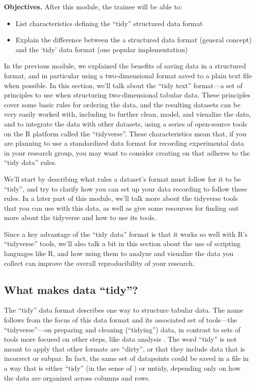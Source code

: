 \documentclass[]{tufte-book}
\providecommand{\tightlist}{%
  \setlength{\itemsep}{0pt}\setlength{\parskip}{0pt}}
\begin{document}
\textbf{Objectives.} After this module, the trainee will be able to:

\begin{itemize}
\tightlist
\item
  List characteristics defining the ``tidy'' structured data format
\item
  Explain the difference between the a structured data format (general concept)
  and the `tidy' data format (one popular implementation)
\end{itemize}

In the previous module, we explained the benefits of saving data in a structured
format, and in particular using a two-dimensional format saved to a plain text
file when possible. In this section, we'll talk about the ``tidy text'' format---a
set of principles to use when structuring two-dimensional tabular data. These
principles cover some basic rules for ordering the data, and the resulting
datasets can be very easily worked with, including to further clean, model, and
visualize the data, and to integrate the data with other datasets, using a
series of open-source tools on the R platform called the ``tidyverse''. These
characteristics mean that, if you are planning to use a standardized data format
for recording experimental data in your research group, you may want to consider
creating on that adheres to the ``tidy data'' rules.

We'll start by describing what rules a dataset's format must follow for it to be
``tidy'', and try to clarify how you can set up your data recording to follow
these rules. In a later part of this module, we'll talk more about the tidyverse
tools that you can use with this data, as well as give some resources for
finding out more about the tidyverse and how to use its tools.

Since a key advantage of the ``tidy data'' format is that it works so well with
R's ``tidyverse'' tools, we'll also talk a bit in this section about the use of
scripting languages like R, and how using them to analyze and visualize the
data you collect can improve the overall reproducibility of your research.

\hypertarget{what-makes-data-tidy}{%
\subsection{What makes data ``tidy''?}\label{what-makes-data-tidy}}

The ``tidy'' data format describes one way to structure tabular data. The name
follows from the focus of this data format and its associated set of tools---the
``tidyverse''---on preparing and cleaning (``tidying'') data, in contrast to sets of
tools more focused on other steps, like data analysis \citep{wickham2014tidy}. The
word ``tidy'' is not meant to apply that other formats are ``dirty'', or that they
include data that is incorrect or subpar. In fact, the same set of datapoints
could be saved in a file in a way that is either ``tidy'' (in the sense of
\citep{wickham2014tidy}) or untidy, depending only on how the data are organized
across columns and rows.
\end{document}
